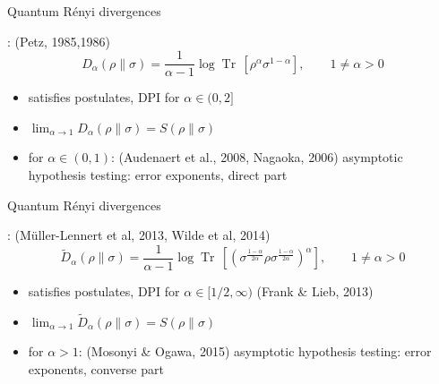 \documentclass[mathserif]{beamer}
\newcommand{\<}{\langle}
\renewcommand{\>}{\rangle}
\newcommand{\Tr}{\operatorname{Tr}\,}
\begin{document}
\begin{frame}{Quantum R\'enyi divergences}

: {\small (Petz, 1985,1986)}
\[
D_\alpha(\rho\|\sigma)=\frac1{\alpha-1}\log\Tr\left[\rho^\alpha\sigma^{1-\alpha}\right], \qquad 1\ne
\alpha>0
\]
\begin{itemize}
\item satisfies postulates, DPI for $\alpha\in (0,2]$
\vskip 3mm
\item $\lim_{\alpha\to 1} D_\alpha(\rho\|\sigma)=S(\rho\|\sigma)$
\vskip 3mm
\item {} for $\alpha\in (0,1)$: {\small (Audenaert et
al., 2008, Nagaoka, 2006)}
\vskip 2mm
asymptotic hypothesis testing: error exponents, direct part

\end{itemize}

\end{frame}


\begin{frame}{Quantum R\'enyi divergences}

: {\small (M\"uller-Lennert et al,
2013, Wilde et al, 2014)} 
\[
\tilde
D_\alpha(\rho\|\sigma)=\frac1{\alpha-1}\log\Tr\left[\left(\sigma^{\frac{1-\alpha}{2\alpha}}\rho\sigma^{\frac{1-\alpha}{2\alpha}}\right)^\alpha\right],\qquad
1\ne \alpha>0
\]
\begin{itemize}
\item satisfies postulates, DPI for $\alpha\in [1/2,\infty)$ {\small (Frank \& Lieb,
2013)}

\vskip 3mm
\item $\lim_{\alpha\to 1} \tilde D_\alpha(\rho\|\sigma)=S(\rho\|\sigma)$
\vskip 3mm
\item {} for $\alpha>1$: {\small (Mosonyi \& Ogawa,
2015)}
\vskip 2mm
asymptotic hypothesis testing: error
exponents, converse part 

\end{itemize}

\end{frame}
\end{document}
